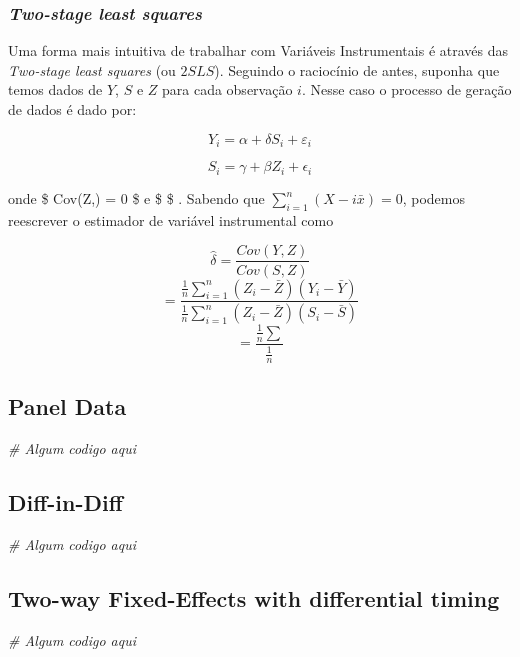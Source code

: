 \documentclass[
]{article}
\newenvironment{Shaded}{\begin{snugshade}}{\end{snugshade}}
\newcommand{\CommentTok}[1]{\textcolor[rgb]{0.56,0.35,0.01}{\textit{#1}}}
\begin{document}
\hypertarget{two-stage-least-squares}{%
\subsubsection{\texorpdfstring{\emph{Two-stage least
squares}}{Two-stage least squares}}\label{two-stage-least-squares}}

Uma forma mais intuitiva de trabalhar com Variáveis Instrumentais é
através das \emph{Two-stage least squares} (ou \(2SLS\)). Seguindo o
raciocínio de antes, suponha que temos dados de \(Y\), \(S\) e \(Z\)
para cada observação \(i\). Nesse caso o processo de geração de dados é
dado por:

\[ Y_i = \alpha + \delta S_i + \varepsilon_i\]

\[ S_i = \gamma + \beta Z_i + \epsilon_i\]

onde \$ Cov(Z,\varepsilon) = 0 \$ e \$\beta {} \$ . Sabendo que
\(\sum_{i=1}^n (X-i \bar{x}) = 0\), podemos reescrever o estimador de
variável instrumental como

\[ \hat{\delta} = \frac{Cov(Y,Z)}{Cov(S,Z)}\]
\[ = \frac{ \frac{1}{n} \sum_{i=1}^n (Z_i - \bar{Z} ) (Y_i - \bar{Y}) } { \frac {1} {n} \sum_{i=1}^n (Z_i - \bar{Z}) (S_i - \bar{S}) }\]
\[ = \frac{ \frac{1}{n} \sum  } {\frac{1}{n} } \]

\newpage

\hypertarget{panel-data}{%
\subsection{Panel Data}\label{panel-data}}

\begin{Shaded}
\begin{Highlighting}[]
\CommentTok{\# Algum codigo aqui}
\end{Highlighting}
\end{Shaded}

\newpage

\hypertarget{diff-in-diff}{%
\subsection{Diff-in-Diff}\label{diff-in-diff}}

\begin{Shaded}
\begin{Highlighting}[]
\CommentTok{\# Algum codigo aqui}
\end{Highlighting}
\end{Shaded}

\newpage

\hypertarget{two-way-fixed-effects-with-differential-timing}{%
\subsection{Two-way Fixed-Effects with differential
timing}\label{two-way-fixed-effects-with-differential-timing}}

\begin{Shaded}
\begin{Highlighting}[]
\CommentTok{\# Algum codigo aqui}
\end{Highlighting}
\end{Shaded}
\end{document}
